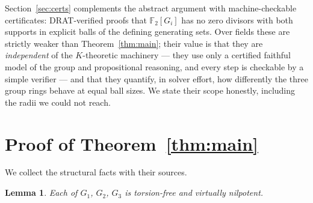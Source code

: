 \documentclass[11pt]{amsart}
\newtheorem{lemma}[theorem]{Lemma}
\theoremstyle{definition}
\newcommand{\GOne}{G_1}
\newcommand{\GTwo}{G_2}
\newcommand{\GThree}{G_3}
\newcommand{\F}{\mathbb{F}}
\begin{document}
Section~\ref{sec:certs} complements the abstract argument with
machine-checkable certificates: DRAT-verified proofs that $\F_2[G_i]$ has
no zero divisors with both supports in explicit balls of the defining
generating sets. Over fields these are strictly weaker than
Theorem~\ref{thm:main}; their value is that they are \emph{independent} of
the $K$-theoretic machinery --- they use only a certified faithful model of
the group and propositional reasoning, and every step is checkable by a
simple verifier --- and that they quantify, in solver effort, how
differently the three group rings behave at equal ball sizes. We state
their scope honestly, including the radii we could not reach.

\section{Proof of Theorem~\ref{thm:main}}\label{sec:proof}

We collect the structural facts with their sources.

\begin{lemma}\label{lem:vn}
Each of $\GOne$, $\GTwo$, $\GThree$ is torsion-free and virtually
nilpotent.
\end{lemma}
\end{document}
